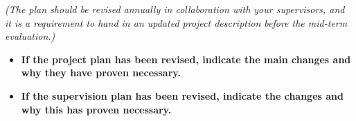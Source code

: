 %
%
\textit{(The plan should be revised annually in collaboration with your supervisors, and it is a requirement to hand in an updated project description before the mid-term evaluation.)}

\begin{itemize}
    \item \textbf{If the project plan has been revised, indicate the main changes and why they have proven necessary.}
    \item \textbf{If the supervision plan has been revised, indicate the changes and why this has proven necessary.}
\end{itemize}